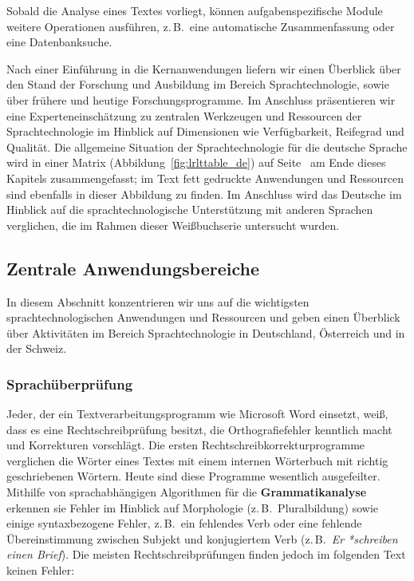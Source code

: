 \begin{multicols}{2}
Sobald die Analyse eines Textes vorliegt, können aufgabenspezifische Module weitere Operationen ausführen, z.\,B.~eine automatische Zusammenfassung oder eine Datenbanksuche. 

Nach einer Einführung in die Kernanwendungen liefern wir einen Überblick über den Stand der Forschung und Ausbildung im Bereich Sprachtechnologie, sowie über frühere und heutige Forschungsprogramme. Im Anschluss präsentieren wir eine Experteneinschätzung zu zentralen Werkzeugen und Ressourcen der Sprachtechnologie im Hinblick auf Dimensionen wie Verfügbarkeit, Reifegrad und Qualität. Die allgemeine Situation der Sprachtechnologie für die deutsche Sprache wird in einer Matrix (Abbildung~\ref{fig:lrlttable_de}) auf Seite~\pageref{fig:lrlttable_de} am Ende dieses Kapitels zusammengefasst; im Text fett gedruckte Anwendungen und Ressourcen sind ebenfalls in dieser Abbildung zu finden. Im Anschluss wird das Deutsche im Hinblick auf die sprachtechnologische Unterstützung mit anderen Sprachen verglichen, die im Rahmen dieser Weißbuchserie untersucht wurden.

\subsection{Zentrale Anwendungsbereiche} 

In diesem Abschnitt konzentrieren wir uns auf die wichtigsten sprachtechnologischen Anwendungen und Ressourcen und geben einen Überblick über Aktivitäten im Bereich Sprachtechnologie in Deutschland, Österreich und in der Schweiz. 

\subsubsection{Sprachüberprüfung}

Jeder, der ein Textverarbeitungsprogramm wie Microsoft Word einsetzt, weiß, dass es eine Rechtschreibprüfung besitzt, die Orthografiefehler kenntlich macht und Korrekturen vorschlägt. Die ersten Rechtschreibkorrekturprogramme verglichen die Wörter eines Textes mit einem internen Wörterbuch mit richtig geschriebenen Wörtern. Heute sind diese Programme wesentlich ausgefeilter. Mithilfe von sprachabhängigen Algorithmen für die \textbf{Grammatikanalyse} erkennen sie Fehler im Hinblick auf Morphologie (z.\,B.~Pluralbildung) sowie einige syntaxbezogene Fehler, z.\,B.~ein fehlendes Verb oder eine fehlende Übereinstimmung zwischen Subjekt und konjugiertem Verb (z.\,B.~\textit{Er *schreiben einen Brief}). Die meisten Rechtschreibprüfungen finden jedoch im folgenden Text 
keinen Fehler:


\end{multicols}
